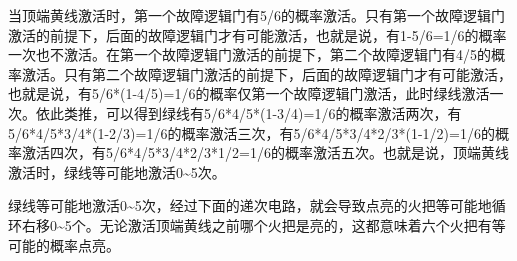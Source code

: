 \begin{figure}[!ht]
\begin{center}
\end{center}
\caption{}
\label{i98:99}
\end{figure}

当顶端黄线激活时，第一个故障逻辑门有5/6的概率激活。只有第一个故障逻辑门激活的前提下，后面的故障逻辑门才有可能激活，也就是说，有1-5/6=1/6的概率一次也不激活。在第一个故障逻辑门激活的前提下，第二个故障逻辑门有4/5的概率激活。只有第二个故障逻辑门激活的前提下，后面的故障逻辑门才有可能激活，也就是说，有5/6*(1-4/5)=1/6的概率仅第一个故障逻辑门激活，此时绿线激活一次。依此类推，可以得到绿线有5/6*4/5*(1-3/4)=1/6的概率激活两次，有5/6*4/5*3/4*(1-2/3)=1/6的概率激活三次，有5/6*4/5*3/4*2/3*(1-1/2)=1/6的概率激活四次，有5/6*4/5*3/4*2/3*1/2=1/6的概率激活五次。也就是说，顶端黄线激活时，绿线等可能地激活0\~{}5次。

绿线等可能地激活0\~{}5次，经过下面的递次电路，就会导致点亮的火把等可能地循环右移0\~{}5个。无论激活顶端黄线之前哪个火把是亮的，这都意味着六个火把有等可能的概率点亮。

